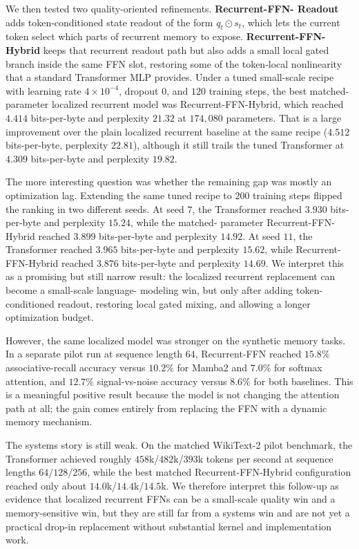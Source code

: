 \documentclass[11pt]{article}
\begin{document}
We then tested two quality-oriented refinements. \textbf{Recurrent-FFN-
Readout} adds token-conditioned state readout of the form $q_t \odot s_t$,
which lets the current token select which parts of recurrent memory to expose.
\textbf{Recurrent-FFN-Hybrid} keeps that recurrent readout path but also adds a
small local gated branch inside the same FFN slot, restoring some of the
token-local nonlinearity that a standard Transformer MLP provides. Under a
tuned small-scale recipe with learning rate $4 \times 10^{-4}$, dropout $0$,
and $120$ training steps, the best matched-parameter localized recurrent model
was Recurrent-FFN-Hybrid, which reached $4.414$ bits-per-byte and perplexity
$21.32$ at $174{,}080$ parameters. That is a large improvement over the plain
localized recurrent baseline at the same recipe ($4.512$ bits-per-byte,
perplexity $22.81$), although it still trails the tuned Transformer at
$4.309$ bits-per-byte and perplexity $19.82$.

The more interesting question was whether the remaining gap was mostly an
optimization lag. Extending the same tuned recipe to $200$ training steps
flipped the ranking in two different seeds. At seed $7$, the Transformer
reached $3.930$ bits-per-byte and perplexity $15.24$, while the matched-
parameter Recurrent-FFN-Hybrid reached $3.899$ bits-per-byte and perplexity
$14.92$. At seed $11$, the Transformer reached $3.965$ bits-per-byte and
perplexity $15.62$, while Recurrent-FFN-Hybrid reached $3.876$ bits-per-byte
and perplexity $14.69$. We interpret this as a promising but still narrow
result: the localized recurrent replacement can become a small-scale language-
modeling win, but only after adding token-conditioned readout, restoring local
gated mixing, and allowing a longer optimization budget.

However, the same localized model was stronger on the synthetic memory tasks.
In a separate pilot run at sequence length $64$, Recurrent-FFN reached
$15.8\%$ associative-recall accuracy versus $10.2\%$ for Mamba2 and $7.0\%$
for softmax attention, and $12.7\%$ signal-vs-noise accuracy versus $8.6\%$
for both baselines. This is a meaningful positive result because the model is
not changing the attention path at all; the gain comes entirely from replacing
the FFN with a dynamic memory mechanism.

The systems story is still weak. On the matched WikiText-2 pilot benchmark,
the Transformer achieved roughly $458$k/$482$k/$393$k tokens per second at
sequence lengths $64/128/256$, while the best matched Recurrent-FFN-Hybrid
configuration reached only about $14.0$k/$14.4$k/$14.5$k. We therefore
interpret this follow-up as evidence that localized recurrent FFNs can be a
small-scale quality win and a memory-sensitive win, but they are still far
from a systems win and are not yet a practical drop-in replacement without
substantial kernel and implementation work.
\end{document}
